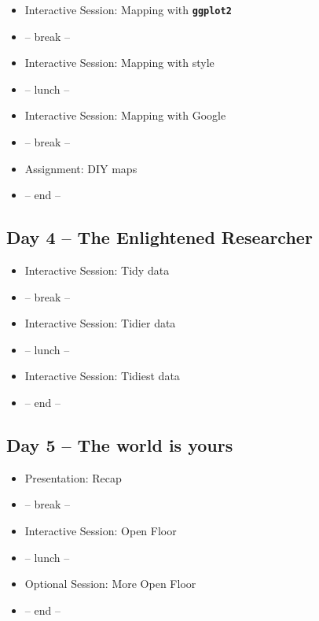 \documentclass[
]{book}
\providecommand{\tightlist}{%
  \setlength{\itemsep}{0pt}\setlength{\parskip}{0pt}}
\begin{document}
\begin{itemize}
\tightlist
\item
  Interactive Session: Mapping with \textbf{\texttt{ggplot2}}
\item
  -- break --
\item
  Interactive Session: Mapping with style
\item
  -- lunch --
\item
  Interactive Session: Mapping with Google
\item
  -- break --
\item
  Assignment: DIY maps
\item
  -- end --
\end{itemize}

\hypertarget{day-4-the-enlightened-researcher}{%
\subsection*{Day 4 -- The Enlightened Researcher}\label{day-4-the-enlightened-researcher}}

\begin{itemize}
\tightlist
\item
  Interactive Session: Tidy data
\item
  -- break --
\item
  Interactive Session: Tidier data
\item
  -- lunch --
\item
  Interactive Session: Tidiest data
\item
  -- end --
\end{itemize}

\hypertarget{day-5-the-world-is-yours}{%
\subsection*{Day 5 -- The world is yours}\label{day-5-the-world-is-yours}}

\begin{itemize}
\tightlist
\item
  Presentation: Recap
\item
  -- break --
\item
  Interactive Session: Open Floor
\item
  -- lunch --
\item
  Optional Session: More Open Floor
\item
  -- end --
\end{itemize}
\end{document}
